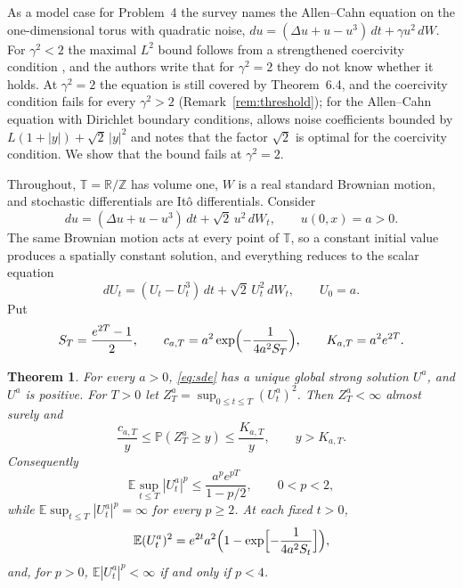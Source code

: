 \documentclass[11pt]{amsart}
\newtheorem{theorem}{Theorem}[section]
\theoremstyle{remark}
\newcommand{\E}{\mathbb E}
\newcommand{\Pp}{\mathbb P}
\newcommand{\R}{\mathbb R}
\newcommand{\T}{\mathbb T}
\begin{document}
As a model case for Problem~4 the survey names the Allen--Cahn equation \cite{AC79} on the one-dimensional torus with quadratic noise, $du=(\Delta u+u-u^3)\,dt+\gamma u^2\,dW$. For $\gamma^2<2$ the maximal $L^2$ bound follows from a strengthened coercivity condition \cite[Section~6.3.1]{AV25}, and the authors write that for $\gamma^2=2$ they do not know whether it holds. At $\gamma^2=2$ the equation is still covered by Theorem~6.4, and the coercivity condition fails for every $\gamma^2>2$ (Remark~\ref{rem:threshold}); for the Allen--Cahn equation with Dirichlet boundary conditions, \cite[Remark~7.2]{AV25} allows noise coefficients bounded by $L(1+|y|)+\sqrt2\,|y|^2$ and notes that the factor $\sqrt2$ is optimal for the coercivity condition. We show that the bound fails at $\gamma^2=2$.

Throughout, $\T=\R/\mathbb Z$ has volume one, $W$ is a real standard Brownian motion, and stochastic differentials are It\^o differentials. Consider
\begin{equation}\label{eq:spde}
 du=(\Delta u+u-u^3)\,dt+\sqrt2\,u^2\,dW_t,\qquad u(0,x)=a>0.
\end{equation}
The same Brownian motion acts at every point of $\T$, so a constant initial value produces a spatially constant solution, and everything reduces to the scalar equation
\begin{equation}\label{eq:sde}
 dU_t=(U_t-U_t^3)\,dt+\sqrt2\,U_t^2\,dW_t,\qquad U_0=a.
\end{equation}
Put
\begin{equation}\label{eq:constants}
 S_T=\frac{e^{2T}-1}{2},\qquad c_{a,T}=a^2\exp\Bigl(-\frac{1}{4a^2S_T}\Bigr),\qquad K_{a,T}=a^2e^{2T}.
\end{equation}

\begin{theorem}\label{thm:main}
For every $a>0$, \eqref{eq:sde} has a unique global strong solution $U^a$, and $U^a$ is positive. For $T>0$ let $Z_T^a=\sup_{0\le t\le T}(U_t^a)^2$. Then $Z_T^a<\infty$ almost surely and
\begin{equation}\label{eq:tail}
 \frac{c_{a,T}}{y}\le\Pp(Z_T^a\ge y)\le\frac{K_{a,T}}{y},\qquad y>K_{a,T}.
\end{equation}
Consequently
\begin{equation}\label{eq:subcritical}
 \E\sup_{t\le T}|U_t^a|^p\le\frac{a^pe^{pT}}{1-p/2},\qquad 0<p<2,
\end{equation}
while $\E\sup_{t\le T}|U_t^a|^p=\infty$ for every $p\ge2$. At each fixed $t>0$,
\begin{equation}\label{eq:second}
 \E(U_t^a)^2=e^{2t}a^2\Bigl(1-\exp\Bigl[-\frac{1}{4a^2S_t}\Bigr]\Bigr),
\end{equation}
and, for $p>0$, $\E|U_t^a|^p<\infty$ if and only if $p<4$.
\end{theorem}
\end{document}
